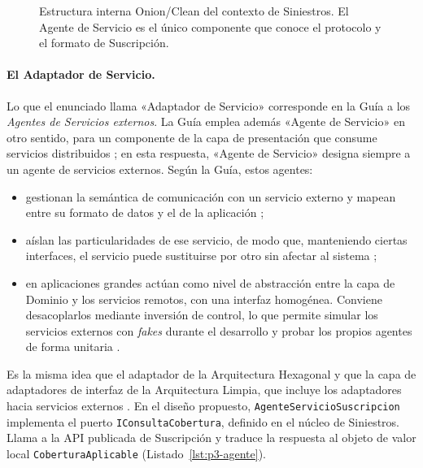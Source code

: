 \begin{figure}[!t]
{%
  }
  \caption{Estructura interna Onion/Clean del contexto de Siniestros. El Agente de
           Servicio es el único componente que conoce el protocolo y el formato de
           Suscripción.}
  \label{fig:p3-cebolla}
\end{figure}

\paragraph{El Adaptador de Servicio.}
Lo que el enunciado llama «Adaptador de Servicio» corresponde en la Guía a los
\emph{Agentes de Servicios externos}. La Guía emplea además «Agente de Servicio» en otro
sentido, para un componente de la capa de presentación que consume servicios distribuidos
\parencite[269]{delatorre2010}; en esta respuesta, «Agente de Servicio» designa siempre a un
agente de servicios externos. Según la Guía, estos agentes:
\begin{itemize}
  \item gestionan la semántica de comunicación con un servicio externo y mapean entre su
        formato de datos y el de la aplicación \parencite[108]{delatorre2010};
  \item aíslan las particularidades de ese servicio, de modo que, manteniendo ciertas
        interfaces, el servicio puede sustituirse por otro sin afectar al sistema
        \parencite[58]{delatorre2010};
  \item en aplicaciones grandes actúan como nivel de abstracción entre la capa de
        Dominio y los servicios remotos, con una interfaz homogénea. Conviene
        desacoplarlos mediante inversión de control, lo que permite simular los servicios
        externos con \textit{fakes} durante el desarrollo y probar los propios agentes de
        forma unitaria \parencite[155--156]{delatorre2010}.
\end{itemize}

Es la misma idea que el adaptador de la Arquitectura Hexagonal
\parencite{cockburn2005} y que la capa de adaptadores de interfaz de la Arquitectura
Limpia, que incluye los adaptadores hacia servicios externos \parencite[205]{martin2017}.
En el diseño propuesto, \texttt{AgenteServicioSuscripcion} implementa el puerto
\texttt{IConsultaCobertura}, definido en el núcleo de Siniestros. Llama a la API
publicada de Suscripción y traduce la respuesta al objeto de valor local
\texttt{CoberturaAplicable} (Listado~\ref{lst:p3-agente}).

